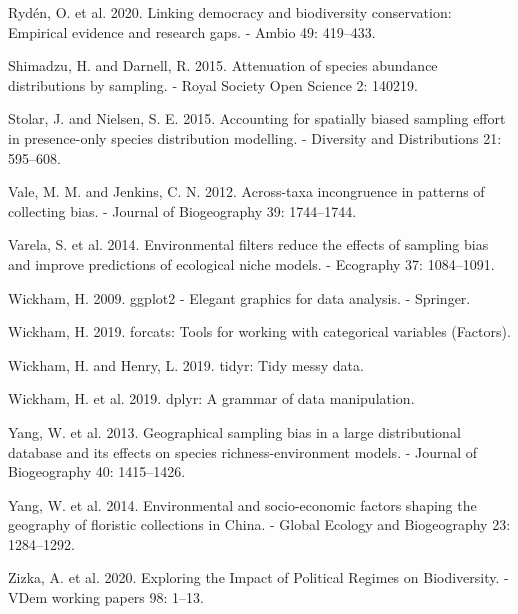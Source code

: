 \documentclass[
  12pt,
]{article}
\begin{document}
\leavevmode\hypertarget{ref-Ryden2019}{}%
Rydén, O. et al. 2020. Linking democracy and biodiversity conservation: Empirical evidence and research gaps. - Ambio 49: 419--433.

\leavevmode\hypertarget{ref-Shimadzu2015}{}%
Shimadzu, H. and Darnell, R. 2015. Attenuation of species abundance distributions by sampling. - Royal Society Open Science 2: 140219.

\leavevmode\hypertarget{ref-Stolar2015}{}%
Stolar, J. and Nielsen, S. E. 2015. Accounting for spatially biased sampling effort in presence-only species distribution modelling. - Diversity and Distributions 21: 595--608.

\leavevmode\hypertarget{ref-Vale2012}{}%
Vale, M. M. and Jenkins, C. N. 2012. Across-taxa incongruence in patterns of collecting bias. - Journal of Biogeography 39: 1744--1744.

\leavevmode\hypertarget{ref-Varela2014}{}%
Varela, S. et al. 2014. Environmental filters reduce the effects of sampling bias and improve predictions of ecological niche models. - Ecography 37: 1084--1091.

\leavevmode\hypertarget{ref-Wickham2009}{}%
Wickham, H. 2009. ggplot2 - Elegant graphics for data analysis. - Springer.

\leavevmode\hypertarget{ref-Wickham2019b}{}%
Wickham, H. 2019. forcats: Tools for working with categorical variables (Factors).

\leavevmode\hypertarget{ref-Wickham2019a}{}%
Wickham, H. and Henry, L. 2019. tidyr: Tidy messy data.

\leavevmode\hypertarget{ref-Wickham2019}{}%
Wickham, H. et al. 2019. dplyr: A grammar of data manipulation.

\leavevmode\hypertarget{ref-Yang2013}{}%
Yang, W. et al. 2013. Geographical sampling bias in a large distributional database and its effects on species richness-environment models. - Journal of Biogeography 40: 1415--1426.

\leavevmode\hypertarget{ref-Yang2014}{}%
Yang, W. et al. 2014. Environmental and socio-economic factors shaping the geography of floristic collections in China. - Global Ecology and Biogeography 23: 1284--1292.

\leavevmode\hypertarget{ref-Zizka2020c}{}%
Zizka, A. et al. 2020. Exploring the Impact of Political Regimes on Biodiversity. - VDem working papers 98: 1--13.
\end{document}
